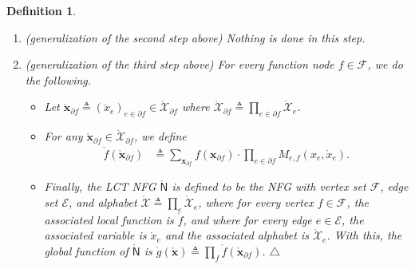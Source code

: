 \documentclass[journal]{IEEEtran}
\newtheorem{definition}[theorem]{Definition}
\newcommand{\manualendsymbol}[1]{%
  \leavevmode\unskip\penalty9999\hbox{}\nobreak\hfill
  \quad\hbox{#1}}
\newcommand{\edefinition}{\manualendsymbol{\ensuremath{\triangle}}}
\newcommand{\vect}[1]{ \bm{#1} }
\newcommand{\setF}{ \mathcal{F} }
\newcommand{\setpf}{ \partial f }
\newcommand{\vx}{ \vect{x} }
\newcommand{\graphN}{ \mathsf{N} }
\newcommand{\setE}{ \mathcal{E} }
\newcommand{\defeq}{ \triangleq }
\newcommand{\LCTset}[1]{\mathring{\mathcal{#1}}}
\newcommand{\LCTv}[1]{ \mathring{ \vect{#1} } }
\newcommand{\LCT}[1]{ \mathring{#1} }
\newcommand{\ef}{ e,f }
\newcommand{\LCTvxf}{ \LCTv{x}_{\setpf} }
\newcommand{\LCTsetx}{ \LCTset{X} }
\newcommand{\LCTsetxe}{ \LCTset{X}_{e} }
\begin{document}
\begin{definition}
\begin{enumerate}
    \item (generalization of the second step above) Nothing is done in this step.

    \item (generalization of the third step above) For every function node
          $f \in \setF$, we do the following.
          \begin{itemize}

            \item Let
                  $\LCTvxf \defeq ( \LCT{x}_e )_{e \in \setpf} \in \LCTsetx_{\setpf}$ where
                  $ \LCTsetx_{\setpf} \defeq \prod_{e \in \setpf} \LCTsetxe $.

            \item For any $
                    \LCTvxf \in \LCTsetx_{\setpf}$, we define
                  \begin{align}
                    \LCT{f}(\LCTvxf)
                     & \defeq \sum_{\vx_{\setpf}}
                    f(\vx_{\setpf})
                    \cdot
                    \prod_{e \in \setpf}
                    M_{\ef}(x_{e}, \LCT{x}_e).
                    \label{sec:LCT:exp:10}
                  \end{align}

            \item Finally, the LCT NFG $\LCT{\graphN}$ is
                  defined to be the NFG with vertex set $\setF$, edge set $\setE$, and alphabet
                  $ \LCTsetx \defeq \prod_{e} \LCTsetxe $,
                  where for every vertex $f \in \setF$, the associated local function is $\LCT{f}$,
                  and where for every edge $e \in \setE$, the associated variable
                  is $\LCT{x}_e$ and the associated alphabet is $ \LCTset{X}_{e} $.
                  With this, the global function of $\LCT{\graphN}$ is
                  $\LCT{g}(\LCTv{x}) \defeq \prod_f \LCT{f}(\LCTvxf)$.\edefinition

          \end{itemize}

  \end{enumerate}
\end{definition}
\end{document}
